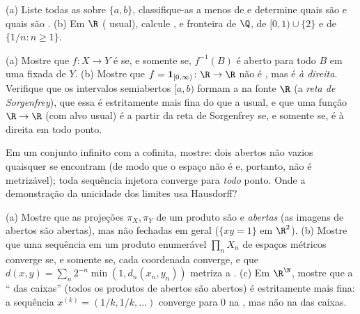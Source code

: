 \begin{exercise}[$\star$]\label{exo:b3:topology:1}
(a) Liste todas as  sobre $\{a, b\}$, classifique-as a menos de
 e determine quais são  e quais são .
(b) Em $\R$ ( usual), calcule ,  e fronteira
de $\Q$, de $[0,1) \cup \{2\}$ e de $\{1/n : n \geq
1\}$.
\end{exercise}

\begin{exercise}[$\star$]\label{exo:b3:topology:2}
(a) Mostre que $f\colon X \to Y$ é  se, e somente se, $f^{-1}(B)$ é aberto para
todo $B$ em uma  fixada de $Y$.
(b) Mostre que $f = \mathbf 1_{[0,\infty)} \colon \R \to \R$ não é , mas é \emph{ à direita}.
Verifique que os intervalos semiabertos $[a, b)$ formam a  na fonte $\R$ (a \emph{reta de Sorgenfrey}), que essa
 é estritamente mais fina do que a usual, e que uma função
$\R \to
\R$ (com alvo usual) é  a partir da reta de Sorgenfrey se, e
somente se, é  à direita em todo ponto.
\end{exercise}

\begin{exercise}[$\star$]\label{exo:b3:topology:3}
Em um conjunto infinito com a  cofinita, mostre: dois abertos
não vazios quaisquer se encontram (de modo que o espaço não é  e, portanto, não é metrizável); toda sequência injetora
converge para \emph{todo} ponto. Onde a demonstração da unicidade dos
limites usa Hausdorff?
\end{exercise}

\begin{exercise}[$\star\star$]\label{exo:b3:topology:4}
(a) Mostre que as projeções $\pi_X, \pi_Y$ de um produto são  e
\emph{abertas} (as imagens de abertos são abertas), mas não fechadas em
geral ($\{xy = 1\}$ em $\R^2$).
(b) Mostre que uma sequência em um produto enumerável $\prod_n X_n$ de espaços
métricos converge se, e somente se, cada coordenada converge, e que
$d(x, y) = \sum_n 2^{-n}\min(1, d_n(x_n, y_n))$ metriza a .
(c) Em $\R^\N$, mostre que a `` das caixas'' (todos os
produtos de abertos são abertos) é estritamente mais fina: a sequência
$x^{(k)} = (1/k, 1/k, \dots)$ converge para $0$ na , mas não na 
das caixas.
\end{exercise}

